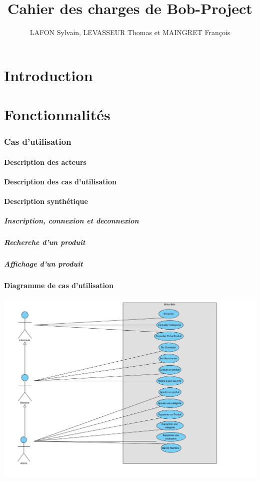 \documentclass[10pt,a4paper]{article}
\title{Cahier des charges de Bob-Project}
\author{LAFON Sylvain, LEVASSEUR Thomas et MAINGRET François}
\begin{document}
	\maketitle
	\tableofcontents
	\newpage
	\part{Introduction}
		
	\newpage
	\part{Fonctionnalités}
		\section{Cas d'utilisation}
			\subsection{Description des acteurs}
				
			\subsection{Description des cas d'utilisation}
				
			\subsection{Description synthétique}
				\subsubsection{Inscription, connexion et deconnexion}
					
				\subsubsection{Recherche d'un produit}
					
				\subsubsection{Affichage d'un produit}
					
			\subsection{Diagramme de cas d'utilisation}
				\includegraphics[scale=0.7,angle=270]{cas/diagramme.jpg}
	\newpage			
\end{document}
